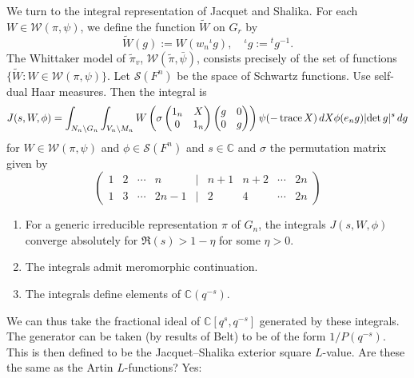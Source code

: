 \documentclass[reqno]{amsart} 
\begin{document}
We turn to the integral representation of Jacquet and Shalika.  For each $W \in \mathcal{W}(\pi, \psi)$, we define the function $\tilde{W}$ on $G_r$ by
\begin{equation*}
  \tilde{W}(g) := W(w_n {}^{\iota} g), \quad
  {}^\iota g := {}^t g^{-1}.
\end{equation*}
The Whittaker model of $\tilde{\pi}_v$, $\mathcal{W}(\tilde{\pi}, \bar{\psi})$, consists precisely of the set of functions $\{\tilde{W} : W \in \mathcal{W}(\pi, \psi)\}$.  Let $\mathcal{S}(F^n)$ be the space of Schwartz functions.  Use self-dual Haar measures.  Then the integral is
\begin{equation*}
  J(s, W, \phi) = \int_{N_n \backslash G_n}
  \int_{V_n \backslash M_n}
  W \left( \sigma
    \begin{pmatrix}
      1_n      & X \\
      0 & 1_n \\
    \end{pmatrix}
    \begin{pmatrix}
      g & 0 \\
      0 & g \\
    \end{pmatrix}\right)
  \psi(- \operatorname{trace} X)
  \, d X
  \phi(e_n g)
  \lvert \det g \rvert^s \, d g
\end{equation*}
for $W \in \mathcal{W}(\pi, \psi)$ and $\phi \in \mathcal{S}(F^n)$ and $s \in \mathbb{C}$ and $\sigma$ the permutation matrix given by
\begin{equation*}
  \begin{pmatrix}
    1 & 2 & \cdots & n & \mid & n+1 & n+2 & \cdots & 2n \\
    1 & 3 & \cdots & 2n-1 & \mid & 2 & 4 & \cdots & 2n
  \end{pmatrix}
\end{equation*}

\begin{proposition}
  \begin{enumerate}
  \item   For a generic irreducible representation $\pi$ of $G_n$, the integrals $J(s, W, \phi)$ converge absolutely for $\Re(s) > 1 - \eta$ for some $\eta > 0$.
  \item The integrals admit meromorphic continuation.
  \item The integrals define elements of $\mathbb{C}(q^{- s})$.
  \end{enumerate}
\end{proposition}
We can thus take the fractional ideal of $\mathbb{C}[q^s, q^{- s}]$ generated by these integrals.  The generator can be taken (by results of Belt) to be of the form $1 / P(q^{-s})$.  This is then defined to be the Jacquet--Shalika exterior square $L$-value.  Are these the same as the Artin $L$-functions?  Yes:
\end{document}
